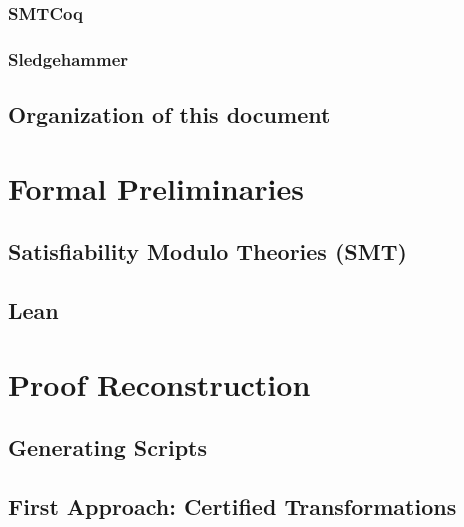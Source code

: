 \documentclass[
	msc,
	english
]{ppgccufmg}
\begin{document}
	    \subsection{SMTCoq}
           \label{sec:smtcoq}
			
		\subsection{Sledgehammer}
           \label{sec:sledgehammer}
			
	  \section{Organization of this document}
	    
	\chapter{Formal Preliminaries}
	  \section{Satisfiability Modulo Theories (SMT)}\label{sec:smt}
	    
	  \section{Lean}
      
	\chapter{Proof Reconstruction}\label{chap:rcons}
    
    \section{Generating Scripts}\label{sec:gen-scripts}
    
    \section{First Approach: Certified Transformations}
    
\end{document}
